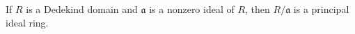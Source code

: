 If $R$ is a Dedekind domain and $\mathfrak{a}$ is a nonzero ideal of $R$, then $R/\mathfrak{a}$ is a principal ideal ring.
